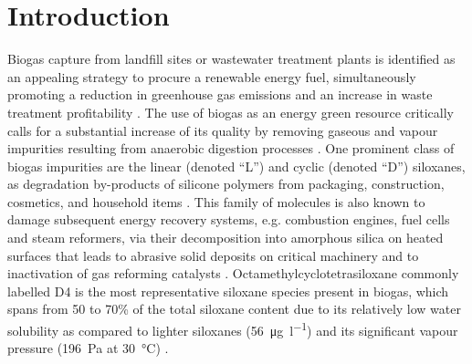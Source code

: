 

\section{Introduction}

Biogas capture from landfill sites or wastewater treatment plants is identified
as an appealing strategy to procure a renewable energy fuel, simultaneously
promoting a reduction in greenhouse gas emissions and an increase in waste
treatment profitability \citep{themelisMethaneGenerationLandfills2007}. The use
of biogas as an energy green resource critically calls for a substantial
increase of its  quality by removing gaseous and vapour impurities
resulting from anaerobic digestion processes
\citep{themelisMethaneGenerationLandfills2007}. One prominent class of biogas
impurities are the linear (denoted ``L'') and cyclic (denoted ``D'') siloxanes,
as degradation by-products of silicone polymers from packaging, construction,
cosmetics, and household items
\citep{takuwaCharacterizationTraceConstituents2009,
ohannessianVolatileOrganicSilicon2008}. This family of molecules is also known
to damage subsequent energy recovery systems, e.g. combustion engines, fuel
cells and steam reformers, via their decomposition into amorphous silica on
heated surfaces that leads to abrasive solid deposits on critical machinery and
to inactivation of gas reforming catalysts \citep{wangRecentAdvancesTechnologies2019}.
Octamethylcyclotetrasiloxane commonly labelled D4 is the most representative
siloxane species present in biogas, which spans from 50 to 70\% of the total
siloxane content due to its relatively low water solubility as compared to
lighter siloxanes (\SI{56}{\micro\gram\per\litre}) and its significant vapour
pressure (\SI{196}{\pascal} at \SI{30}{\degreeCelsius})
\citep{ohannessianVolatileOrganicSilicon2008,
wangRecentAdvancesTechnologies2019, dewilEnergyUseBiogas2006}.

